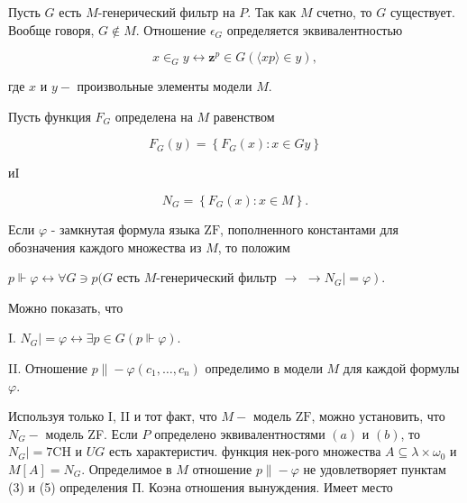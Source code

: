 \documentclass[10pt]{article}
\begin{document}
Пусть $G$ есть $M$-генерический фильтр на $P$. Так как $M$ счетно, то $G$ существует. Вообще говоря, $G \notin M$. Отношение $\epsilon_{G}$ определяется эквивалентностью



\[

x \in_{G} y \longleftrightarrow \boldsymbol{z}^{p} \in G(\langle x p\rangle \in y),

\]



где $x$ и $y-$ произвольные элементы модели $M$.



Пусть функция $F_{G}$ определена на $M$ равенством



\[

F_{G}(y)=\left\{F_{G}(x): x \in G y\right\}

\]



иI



\[

N_{G}=\left\{F_{G}(x): x \in M\right\} .

\]



Если $\varphi$ - замкнутая формула языка $\mathrm{ZF}$, пополненного константами для обозначения каждого множества из $M$, то положим



$p \Vdash \varphi \longleftrightarrow \forall G \ni p(G$ есть $M$-генерический фильтр $\rightarrow$ $\left.\rightarrow N_{G} \mid=\varphi\right)$.



Можно показать, что



I. $N_{G} \mid=\varphi \leftrightarrow \exists p \in G(p \Vdash \varphi)$.



II. Отношение $p \|-\varphi\left(c_{1}, \ldots, c_{n}\right)$ определимо в модели $M$ для каждой формулы $\varphi$.



Используя только I, II и тот факт, что $M-$ модель $\mathrm{ZF}$, можно установить, что $N_{G}-$ модель ZF. Если $P$ определено эквивалентностями $(a)$ и $(b)$, то $N_{G} \mid=7 \mathrm{CH}$ и $U G$ есть характеристич. функция нек-рого множества $A \subseteq \lambda \times \omega_{0}$ и $M[A]=N_{G}$. Определимое в $M$ отношение $p \|-\varphi$ не удовлетворяет пунктам (3) и (5) определения П. Коэна отношения вынуждения. Имеет место
\end{document}
